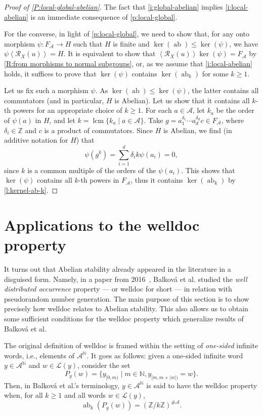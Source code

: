 \documentclass{amsart}
\newcommand*{\N}{\mathbb{N}}
\newcommand*{\nn}{\mathbb{N}}
\newcommand*{\zz}{\mathbb{Z}}
\newcommand*{\Z}{\mathbb{Z}}
\newcommand*{\ret}{\mathcal{R}}
\newcommand*{\lang}{\mathcal{L}}
\newcommand*{\cA}{\mathcal{A}}
\newcommand*{\from}{\colon}
\newcommand*{\lcm}{\operatorname{lcm}}
\newcommand*{\ab}{\operatorname{ab}}
\newcommand*{\card}{\#}
\newcommand*{\gen}[1]{\left\langle #1\right\rangle}
\theoremstyle{plain}
\theoremstyle{definition}
\theoremstyle{remark}
\begin{document}
\begin{proof}[Proof of \cref{P:local-global-abelian}]
    The fact that \ref{i:global-abelian} implies \ref{i:local-abelian} is an immediate consequence of \cref{p:local-global}. 
    
    For the converse, in light of \cref{p:local-global}, we need to show that, for any onto morphism $\psi\from F_\cA\to H$ such that $H$ is finite and $\ker(\ab)\leq\ker(\psi)$, we have $\psi\gen{\ret_X(u)} = H$. It is equivalent to show that $\gen{\ret_X(u)}\ker(\psi) = F_\cA$ by \cref{R:from morphisms to normal subgroups}, or, as we assume that \ref{i:local-abelian} holds, it suffices to prove that $\ker(\psi)$ contains $\ker(\ab_k)$ for some $k\geq 1$.
    
    Let us fix such a morphism $\psi$. As $\ker(\ab)\leq\ker(\psi)$, the latter contains all commutators (and in particular, $H$ is Abelian). Let us show that it contains all $k$-th powers for an appropriate choice of $k \geq 1$. For each $a\in \cA$, let $k_a$ be the order of $\psi(a)$ in $H$, and let $k=\lcm\{k_a \mid a\in \cA\}$. Take $g = a_1^{\delta_1}\cdots a_d^{\delta_d}c \in F_\cA$, where $\delta_i\in\zz$ and $c$ is a product of commutators. Since $H$ is Abelian, we find (in additive notation for $H$) that
    \begin{equation*}
        \psi(g^k) = \sum_{i=1}^d\delta_ik\psi(a_i) = 0,
    \end{equation*} 
    since $k$ is a common multiple of the orders of the $\psi(a_i)$. This shows that $\ker(\psi)$ contains all $k$-th powers in $F_\cA$, thus it contains $\ker(\ab_k)$ by \cref{l:kernel-ab-k}.
\end{proof}

\section{Applications to the welldoc property}
\label{s:welldoc}

It turns out that Abelian stability already appeared in the literature in a disguised form. Namely, in a paper from 2016~\cite{Balkova2016}, Balková et al. studied the \emph{well distributed occurrence} property --- or welldoc for short --- in relation with pseudorandom number generation. The main purpose of this section is to show precisely how welldoc relates to Abelian stability. This also allows us to obtain some sufficient conditions for the welldoc property which generalize results of Balková et al.

The original definition of welldoc is framed within the setting of \emph{one-sided} infinite words, i.e., elements of $\cA^\nn$. It goes as follows: given a one-sided infinite word $y\in \cA^\nn$ and $w \in \lang(y)$, consider the set
\begin{equation*}
    P_y(w)  = \{y_{[0,m)} \mid m \in \N, y_{[m,m+|w|)} = w\}.
\end{equation*}  
Then, in Balková et al.'s terminology, $y \in \cA^\N$ is said to have the welldoc property when, for all $k\geq 1$ and all words $w\in\lang(y)$, 
\begin{equation*}
    \ab_k(P_y(w)) = (\Z/k\Z)^{\card\cA}.
\end{equation*}
\end{document}
